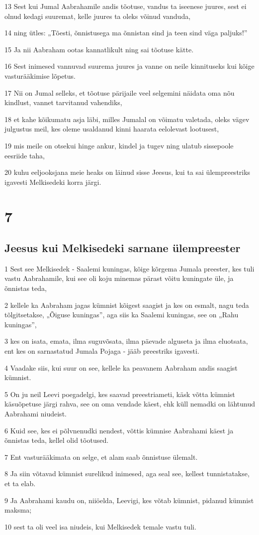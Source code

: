 \par 13 Sest kui Jumal Aabrahamile andis tõotuse, vandus ta iseenese juures, sest ei olnud kedagi suuremat, kelle juures ta oleks võinud vanduda,
\par 14 ning ütles: „Tõesti, õnnistusega ma õnnistan sind ja teen sind väga paljuks!”
\par 15 Ja nii Aabraham ootas kannatlikult ning sai tõotuse kätte.
\par 16 Sest inimesed vannuvad suurema juures ja vanne on neile kinnituseks kui kõige vasturääkimise lõpetus.
\par 17 Nii on Jumal selleks, et tõotuse pärijaile veel selgemini näidata oma nõu kindlust, vannet tarvitanud vahendiks,
\par 18 et kahe kõikumatu asja läbi, milles Jumalal on võimatu valetada, oleks vägev julgustus meil, kes oleme usaldanud kinni haarata eelolevast lootusest,
\par 19 mis meile on otsekui hinge ankur, kindel ja tugev ning ulatub sissepoole eesriide taha,
\par 20 kuhu eeljooksjana meie heaks on läinud sisse Jeesus, kui ta sai ülempreestriks igavesti Melkisedeki korra järgi.


\chapter{7}

\section*{Jeesus kui Melkisedeki sarnane ülempreester}

\par 1 Sest see Melkisedek - Saalemi kuningas, kõige kõrgema Jumala preester, kes tuli vastu Aabrahamile, kui see oli koju minemas pärast võitu kuningate üle, ja õnnistas teda,
\par 2 kellele ka Aabraham jagas kümnist kõigest saagist ja kes on esmalt, nagu teda tõlgitsetakse, „Õiguse kuningas”, aga siis ka Saalemi kuningas, see on „Rahu kuningas”,
\par 3 kes on isata, emata, ilma suguvõsata, ilma päevade alguseta ja ilma eluotsata, ent kes on sarnastatud Jumala Pojaga - jääb preestriks igavesti.
\par 4 Vaadake siis, kui suur on see, kellele ka peavanem Aabraham andis saagist kümnist.
\par 5 On ju neil Leevi poegadelgi, kes saavad preestriameti, käsk võtta kümnist käsuõpetuse järgi rahva, see on oma vendade käest, ehk küll nemadki on lähtunud Aabrahami niudeist.
\par 6 Kuid see, kes ei põlvnenudki nendest, võttis kümnise Aabrahami käest ja õnnistas teda, kellel olid tõotused.
\par 7 Ent vasturääkimata on selge, et alam saab õnnistuse ülemalt.
\par 8 Ja siin võtavad kümnist surelikud inimesed, aga seal see, kellest tunnistatakse, et ta elab.
\par 9 Ja Aabrahami kaudu on, niiöelda, Leevigi, kes võtab kümnist, pidanud kümnist maksma;
\par 10 sest ta oli veel isa niudeis, kui Melkisedek temale vastu tuli.

